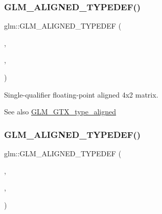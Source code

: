 \subsubsection{\texorpdfstring{G\+L\+M\+\_\+\+A\+L\+I\+G\+N\+E\+D\+\_\+\+T\+Y\+P\+E\+D\+E\+F()}{GLM\_ALIGNED\_TYPEDEF()}\hspace{0.1cm}{\footnotesize\ttfamily [190/209]}}
{\footnotesize\ttfamily glm\+::\+G\+L\+M\+\_\+\+A\+L\+I\+G\+N\+E\+D\+\_\+\+T\+Y\+P\+E\+D\+EF (\begin{DoxyParamCaption}\item[{\hyperlink{group__gtc__type__precision_gab0498cc84bb77002f41630e3cd0be87b}{f32mat4x2}}]{,  }\item[{aligned\+\_\+f32mat4x2}]{,  }\item[{16}]{ }\end{DoxyParamCaption})}

Single-\/qualifier floating-\/point aligned 4x2 matrix. \begin{DoxySeeAlso}{See also}
\hyperlink{group__gtx__type__aligned}{G\+L\+M\+\_\+\+G\+T\+X\+\_\+type\+\_\+aligned} 
\end{DoxySeeAlso}
\mbox{\label{group__gtx__type__aligned_ga9476ef66790239df53dbe66f3989c3b5}} 
\subsubsection{\texorpdfstring{G\+L\+M\+\_\+\+A\+L\+I\+G\+N\+E\+D\+\_\+\+T\+Y\+P\+E\+D\+E\+F()}{GLM\_ALIGNED\_TYPEDEF()}\hspace{0.1cm}{\footnotesize\ttfamily [191/209]}}
{\footnotesize\ttfamily glm\+::\+G\+L\+M\+\_\+\+A\+L\+I\+G\+N\+E\+D\+\_\+\+T\+Y\+P\+E\+D\+EF (\begin{DoxyParamCaption}\item[{\hyperlink{group__gtc__type__precision_ga74544c9bd76adba0e7767b6b2a574d0f}{f32mat4x3}}]{,  }\item[{aligned\+\_\+f32mat4x3}]{,  }\item[{16}]{ }\end{DoxyParamCaption})}

